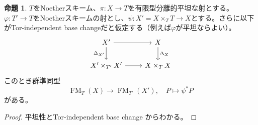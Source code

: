 \documentclass[uplatex, a4paper, dvipdfmx]{jsarticle}
\theoremstyle{definition}
\newtheorem{proposition}[theorem]{命題}
\DeclareMathOperator{\FM}{\mathrm{FM}}
\begin{document}
\begin{proposition}
    $T$をNoetherスキーム、$\pi \colon X \to T$を有限型分離的平坦な射とする。$\varphi \colon T' \to T$をNoetherスキームの射とし、$\psi \colon X' = X \times_T T \to X$とする。さらに以下がTor-independent base changeだと仮定する（例えば$\varphi$が平坦ならよい）。
    \[
        \begin{tikzcd}
            X' \ar[r] \ar[d, "\Delta_{X'}"'] & X \ar[d, "\Delta_X"]\\
            X' \times_{T'} X' \ar[r] & X \times_T X
        \end{tikzcd}
    \]
    このとき群準同型
    \begin{equation}
        \FM_T(X) \to \FM_{T'}(X'), \quad P \mapsto \psi^*P
    \end{equation}
    がある。
\end{proposition}
\begin{proof}
    平坦性とTor-independent base change からわかる。
\end{proof}
\end{document}

